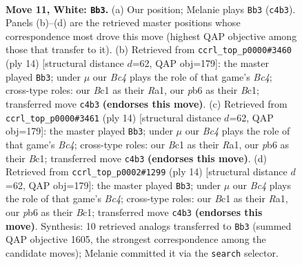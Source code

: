 \documentclass[11pt]{article}
\begin{document}
\clearpage

\begin{figure}[p]\centering
\begin{subfigure}{0.46\textwidth}\centering
\resizebox{\linewidth}{!}{%
\newchessgame
\chessboard[
  setfen={r1bq1rk1/2p2p2/1pnp1np1/p1b1p2p/2B1P2P/2PP1N2/PP1N1PP1/R1BQR1K1 w - - 0 11},
  showmover=false,
  pgfstyle=straightmove, color=movearrow, markmove={c4-b3}
]}
\caption{}
\end{subfigure}\hfill
\begin{subfigure}{0.46\textwidth}\centering
\resizebox{\linewidth}{!}{%
\newchessgame
\chessboard[
  setfen={r1bq1rk1/1pp2ppp/p1np1n2/2b1p3/2B1P3/2PP1N2/PP1N1PPP/R1BQ1RK1 w - - 0 8},
  showmover=false,
  pgfstyle=straightmove, color=movearrow, markmove={c4-b3}
]}
\caption{}
\end{subfigure}
\\[4pt]
\begin{subfigure}{0.46\textwidth}\centering
\resizebox{\linewidth}{!}{%
\newchessgame
\chessboard[
  setfen={r1bq1rk1/1pp2ppp/p1np1n2/2b1p3/2B1P3/2PP1N2/PP1N1PPP/R1BQ1RK1 w - - 0 8},
  showmover=false,
  pgfstyle=straightmove, color=movearrow, markmove={c4-b3}
]}
\caption{}
\end{subfigure}\hfill
\begin{subfigure}{0.46\textwidth}\centering
\resizebox{\linewidth}{!}{%
\newchessgame
\chessboard[
  setfen={r1bq1rk1/1pp2ppp/p1np1n2/2b1p3/2B1P3/2PP1N2/PP1N1PPP/R1BQ1RK1 w - - 2 8},
  showmover=false,
  pgfstyle=straightmove, color=movearrow, markmove={c4-b3}
]}
\caption{}
\end{subfigure}
\caption{\textbf{Move 11, White: \texttt{Bb3}.} (a) Our position; Melanie plays \texttt{Bb3} (\texttt{c4b3}). Panels (b)--(d) are the retrieved master positions whose correspondence most drove this move (highest QAP objective among those that transfer to it). (b) Retrieved from \texttt{ccrl\_top\_p0000\#3460} (ply 14) [structural distance $d$=62, QAP obj=179]: the master played \texttt{Bb3}; under $\mu$ our \emph{Bc4} plays the role of that game's \emph{Bc4}; cross-type roles: our \emph{B}c1 as their \emph{R}a1, our \emph{p}b6 as their \emph{B}c1; transferred move \texttt{c4b3} \textbf{(endorses this move)}. (c) Retrieved from \texttt{ccrl\_top\_p0000\#3461} (ply 14) [structural distance $d$=62, QAP obj=179]: the master played \texttt{Bb3}; under $\mu$ our \emph{Bc4} plays the role of that game's \emph{Bc4}; cross-type roles: our \emph{B}c1 as their \emph{R}a1, our \emph{p}b6 as their \emph{B}c1; transferred move \texttt{c4b3} \textbf{(endorses this move)}. (d) Retrieved from \texttt{ccrl\_top\_p0002\#1299} (ply 14) [structural distance $d$=62, QAP obj=179]: the master played \texttt{Bb3}; under $\mu$ our \emph{Bc4} plays the role of that game's \emph{Bc4}; cross-type roles: our \emph{B}c1 as their \emph{R}a1, our \emph{p}b6 as their \emph{B}c1; transferred move \texttt{c4b3} \textbf{(endorses this move)}. Synthesis: 10 retrieved analogs transferred to \texttt{Bb3} (summed QAP objective 1605, the strongest correspondence among the candidate moves); Melanie committed it via the \texttt{search} selector.}
\label{fig:thought-m20}
\end{figure}
\end{document}
